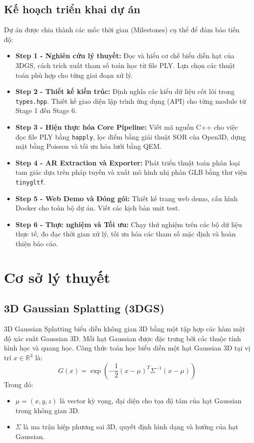 \documentclass[a4paper,12pt]{report}
\begin{document}
\section{Kế hoạch triển khai dự án}
Dự án được chia thành các mốc thời gian (Milestones) cụ thể để đảm bảo tiến độ:
\begin{itemize}
    \item \textbf{Step 1 - Nghiên cứu lý thuyết:} Đọc và hiểu cơ chế biểu diễn hạt của 3DGS, cách trích xuất tham số toán học từ file PLY. Lựa chọn các thuật toán phù hợp cho từng giai đoạn xử lý.
    \item \textbf{Step 2 - Thiết kế kiến trúc:} Định nghĩa các kiểu dữ liệu cốt lõi trong \texttt{types.hpp}. Thiết kế giao diện lập trình ứng dụng (API) cho từng module từ Stage 1 đến Stage 6.
    \item \textbf{Step 3 - Hiện thực hóa Core Pipeline:} Viết mã nguồn C++ cho việc đọc file PLY bằng \texttt{happly}, lọc điểm bằng giải thuật SOR của Open3D, dựng mặt bằng Poisson và tối ưu hóa lưới bằng QEM.
    \item \textbf{Step 4 - AR Extraction và Exporter:} Phát triển thuật toán phân loại tam giác dựa trên pháp tuyến và xuất mô hình nhị phân GLB bằng thư viện \texttt{tinygltf}.
    \item \textbf{Step 5 - Web Demo và Đóng gói:} Thiết kế trang web demo, cấu hình Docker cho toàn bộ dự án. Viết các kịch bản unit test.
    \item \textbf{Step 6 - Thực nghiệm và Tối ưu:} Chạy thử nghiệm trên các bộ dữ liệu thực tế, đo đạc thời gian xử lý, tối ưu hóa các tham số mặc định và hoàn thiện báo cáo.
\end{itemize}

\chapter{Cơ sở lý thuyết}

\section{3D Gaussian Splatting (3DGS)}
3D Gaussian Splatting biểu diễn không gian 3D bằng một tập hợp các hàm mật độ xác suất Gaussian 3D. Mỗi hạt Gaussian được đặc trưng bởi các thuộc tính hình học và quang học. Công thức toán học biểu diễn một hạt Gaussian 3D tại vị trí $x \in \mathbb{R}^3$ là:
\begin{equation}
    G(x) = \exp\left(-\frac{1}{2} (x-\mu)^T \Sigma^{-1} (x-\mu)\right)
\end{equation}
Trong đó:
\begin{itemize}
    \item $\mu = (x, y, z)$ là vector kỳ vọng, đại diện cho tọa độ tâm của hạt Gaussian trong không gian 3D.
    \item $\Sigma$ là ma trận hiệp phương sai 3D, quyết định hình dạng và hướng của hạt Gaussian.
\end{itemize}
\end{document}
